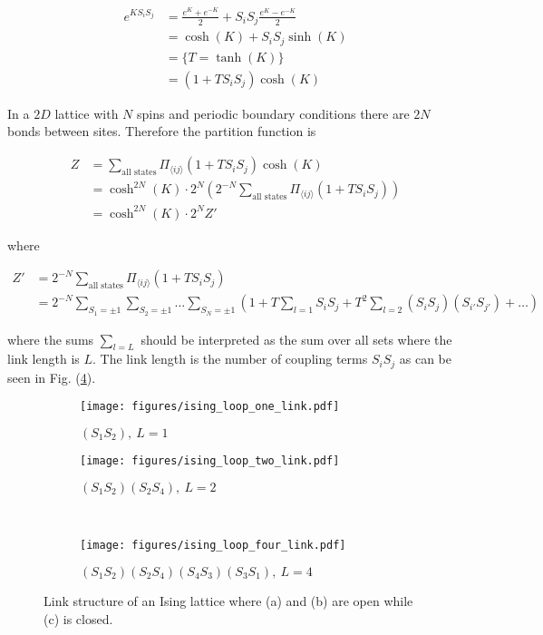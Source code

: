 \begin{align*}
    e^{KS_i S_j} &= \frac{e^K + e^{-K}}{2} + S_i S_j \frac{e^K - e^{-K}}{2} \\
    &= \cosh (K) + S_i S_j \sinh(K) \\
    &= \{ T = \tanh(K) \} \\
    &= (1 + T S_i S_j) \cosh(K)
\end{align*}

In a $2D$ lattice with $N$ spins and periodic boundary conditions there are $2N$ bonds between sites. Therefore the partition function is

\begin{align*}
    Z &= \sum_{\text{all states}} \Pi_{\langle ij \rangle} (1 + T S_i S_j) \cosh(K) \\
    &= \cosh^{2N} (K) \cdot 2^N \left ( 2^{-N} \sum_{\text{all states}} \Pi_{\langle ij \rangle} (1 + T S_i S_j) \right ) \\
    &= \cosh^{2N} (K) \cdot 2^N Z'
\end{align*}

\noindent where

\begin{align*}
    Z' &= 2^{-N} \sum_{\text{all states}} \Pi_{\langle ij \rangle} (1 + T S_i S_j) \\
    &= 2^{-N} \sum_{S_1 = \pm 1} \sum_{S_2 = \pm 1} \ldots \sum_{S_N = \pm 1} \left ( 1 + T \sum_{l = 1} S_i S_j + T^2 \sum_{l = 2} (S_i S_j)(S_{i'} S_{j'}) + \ldots \right ) 
\end{align*}

\noindent where the sums $\sum_{l=L}$ should be interpreted as the sum over all sets where the link length is $L$. The link length is the number of coupling terms $S_i S_j$ as can be seen in Fig. (\ref{fig:LinkIsing}).

\begin{figure}[h!]
    \begin{subfigure}{.5\linewidth}
        \centering
        \texttt{[image: figures/ising\_loop\_one\_link.pdf]}
        \caption{$(S_1 S_2), \ L = 1$}
        \label{fig:oneLinkIsing}
    \end{subfigure}%
    \begin{subfigure}{.5\linewidth}
        \centering
        \texttt{[image: figures/ising\_loop\_two\_link.pdf]}
        \caption{$(S_1 S_2)(S_2 S_4), \ L = 2$}
        \label{fig:twoLinkIsing}
    \end{subfigure}\\[1ex]
    \begin{subfigure}{\linewidth}
        \centering
        \texttt{[image: figures/ising\_loop\_four\_link.pdf]}
        \caption{$(S_1 S_2)(S_2 S_4)(S_4 S_3)(S_3 S_1), \ L = 4$}
    \label{fig:fourLinkIsing}
    \end{subfigure}
    \caption{Link structure of an Ising lattice where (a) and (b) are open while (c) is closed.}
    \label{fig:LinkIsing}
\end{figure}

